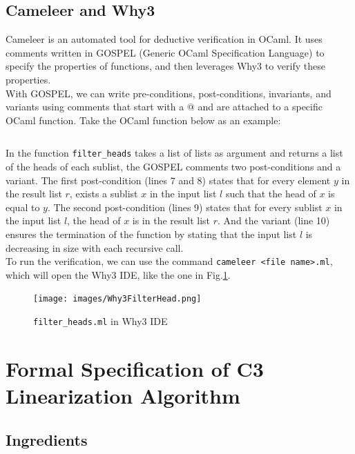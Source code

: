 \documentclass[runningheads]{llncs}
\begin{document}
\subsection{Cameleer and Why3}
Cameleer\autocite{pereiraCameleerDeductiveVerification2021} is an automated tool for deductive verification in OCaml. It uses comments written in GOSPEL\autocite{chargueraudGOSPELProvidingOCaml2019} (Generic OCaml Specification Language) to specify the properties of functions, and then leverages Why3\autocite{filliatreWhy3WherePrograms2013a} to verify these properties.\\
With GOSPEL, we can write pre-conditions, post-conditions, invariants, and variants using comments that start with a @ and are attached to a specific OCaml function. Take the OCaml function below as an example:
\inputminted[fontsize=\small,linenos,xleftmargin=20pt]{ocaml}{../../not_repeated/teste.ml}
In the function \texttt{filter\_heads} takes a list of lists as argument and returns a list of the heads of each sublist, the GOSPEL comments two post-conditions and a variant.
The first post-condition (lines 7 and 8) states that for every element \( y \) in the result list \( r \), exists a sublist \( x \) in the input list \( l \) such that the head of \( x \) is equal to \( y \).
The second post-condition (lines 9) states that for every sublist \( x \) in the input list \( l \), the head of \( x \) is in the result list \( r \).
And the variant (line 10) ensures the termination of the function by stating that the input list \( l \) is decreasing in size with each recursive call.\\
To run the verification, we can use the command \texttt{cameleer <file name>.ml}, which will open the Why3 IDE, like the one in Fig.\ref{fig:Why3FilterHeads}.

\begin{figure}[htbp]
  \centering
  \texttt{[image: images/Why3FilterHead.png]}
  \caption{\texttt{filter\_heads.ml} in Why3 IDE}
  \label{fig:Why3FilterHeads}
\end{figure}



\section{Formal Specification of C3 Linearization Algorithm}


\subsection{Ingredients}
\end{document}
